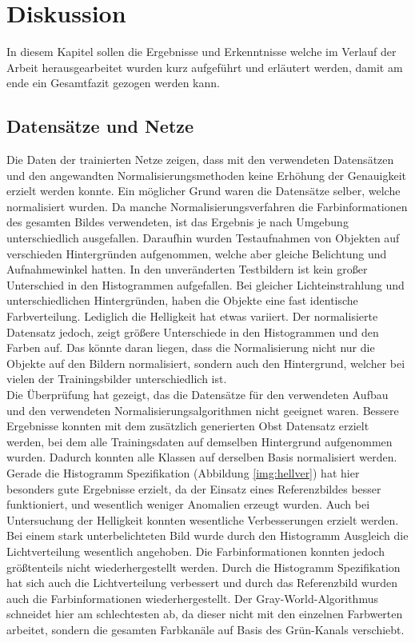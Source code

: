 \chapter{Diskussion}\label{s.diskussion}
In diesem Kapitel sollen die Ergebnisse und Erkenntnisse welche im Verlauf der Arbeit herausgearbeitet wurden kurz aufgeführt und erläutert werden, damit am ende ein Gesamtfazit gezogen werden kann.
\section{Datensätze und Netze}
Die Daten der trainierten Netze zeigen, dass mit den verwendeten Datensätzen und den angewandten Normalisierungsmethoden keine Erhöhung der Genauigkeit erzielt werden konnte. Ein möglicher Grund waren die Datensätze selber, welche normalisiert wurden. Da manche Normalisierungsverfahren die Farbinformationen des gesamten Bildes verwendeten, ist das Ergebnis je nach Umgebung unterschiedlich ausgefallen.
Daraufhin wurden Testaufnahmen von Objekten auf verschieden Hintergründen aufgenommen, welche aber gleiche Belichtung und Aufnahmewinkel hatten. In den unveränderten Testbildern ist kein großer Unterschied in den Histogrammen aufgefallen. Bei gleicher Lichteinstrahlung und unterschiedlichen Hintergründen, haben die Objekte eine fast identische Farbverteilung. Lediglich die Helligkeit hat etwas variiert. Der normalisierte Datensatz jedoch, zeigt größere Unterschiede in den Histogrammen und den Farben auf. Das könnte daran liegen, dass die Normalisierung nicht nur die Objekte auf den Bildern normalisiert, sondern auch den Hintergrund, welcher bei vielen der Trainingsbilder unterschiedlich ist.\\ 
Die Überprüfung hat gezeigt, das die Datensätze für den verwendeten Aufbau und den verwendeten Normalisierungsalgorithmen nicht geeignet waren. Bessere Ergebnisse konnten mit dem zusätzlich generierten Obst Datensatz erzielt werden, bei dem alle Trainingsdaten auf demselben Hintergrund aufgenommen wurden. Dadurch konnten alle Klassen auf derselben Basis normalisiert werden. Gerade die Histogramm Spezifikation (Abbildung \ref{img:hellver}) hat hier besonders gute Ergebnisse erzielt, da der Einsatz eines Referenzbildes besser funktioniert, und wesentlich weniger Anomalien erzeugt wurden. Auch bei Untersuchung der Helligkeit konnten wesentliche Verbesserungen erzielt werden. Bei einem stark unterbelichteten Bild wurde durch den Histogramm Ausgleich die Lichtverteilung wesentlich angehoben. Die Farbinformationen konnten jedoch größtenteils nicht wiederhergestellt werden. Durch die Histogramm Spezifikation hat sich auch die Lichtverteilung verbessert und durch das Referenzbild wurden auch die Farbinformationen wiederhergestellt. Der Gray-World-Algorithmus schneidet hier am schlechtesten ab, da dieser nicht mit den einzelnen Farbwerten arbeitet, sondern die gesamten Farbkanäle auf Basis des Grün-Kanals verschiebt. 
